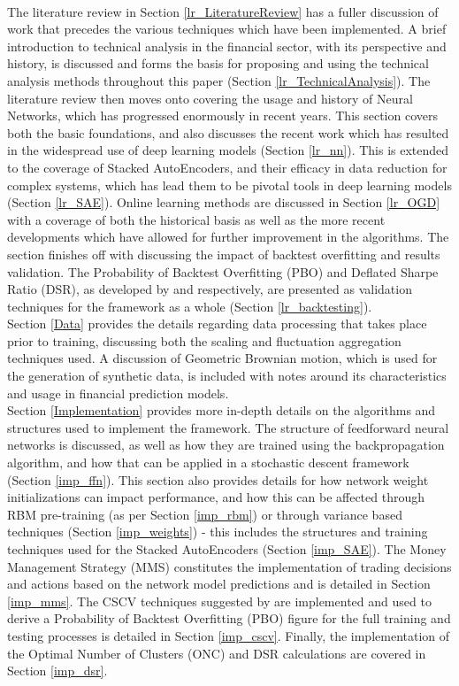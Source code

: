 \documentclass[a4paper,11pt,oneside]{article}
\theoremstyle{plain}
\theoremstyle{definition}
\begin{document}
	~\\\newline
	The literature review in Section \ref{lr_LiteratureReview} has a fuller discussion of work that precedes the various techniques which have been implemented. A brief introduction to technical analysis in the financial sector, with its perspective and history, is discussed and forms the basis for proposing and using the technical analysis methods throughout this paper (Section \ref{lr_TechnicalAnalysis}). The literature review then moves onto covering the usage and history of Neural Networks, which has progressed enormously in recent years. This section covers both the basic foundations, and also discusses the recent work which has resulted in the widespread use of deep learning models (Section \ref{lr_nn}). This is extended to the coverage of Stacked AutoEncoders, and their efficacy in data reduction for complex systems, which has lead them to be pivotal tools in deep learning models (Section \ref{lr_SAE}). Online learning methods are discussed in Section \ref{lr_OGD} with a coverage of both the historical basis as well as the more recent developments which have allowed for further improvement in the algorithms. The section finishes off with discussing the impact of backtest overfitting and results validation. 
	The Probability of Backtest Overfitting (PBO) and Deflated Sharpe Ratio (DSR), as developed by \citet{BailyPBO} and \citet{PradoDSR} respectively, are presented as validation techniques for the framework as a whole (Section \ref{lr_backtesting}).	
	~\\\newline
	Section \ref{Data} provides the details regarding data processing that takes place prior to training, discussing both the scaling and fluctuation aggregation techniques used. A discussion of Geometric Brownian motion, which is used for the generation of synthetic data, is included with notes around its characteristics and usage in financial prediction models.
	~\\\newline
		Section \ref{Implementation} provides more in-depth details on the algorithms and structures used to implement the framework. The structure of feedforward neural networks is discussed, as well as how they are trained using the backpropagation algorithm, and how that can be applied in a stochastic descent framework (Section \ref{imp_ffn}). This section also provides details for how network weight initializations can impact performance, and how this can be affected through RBM pre-training (as per Section \ref{imp_rbm}) or through variance based techniques (Section \ref{imp_weights}) - this includes the structures and training techniques used for the Stacked AutoEncoders (Section \ref{imp_SAE}). The Money Management Strategy (MMS) constitutes the implementation of trading decisions and actions based on the network model predictions and is detailed in Section \ref{imp_mms}. The CSCV techniques suggested by \citet{BailyPBO} are implemented and used to derive a Probability of Backtest Overfitting (PBO) figure for the full training and testing processes is detailed in Section \ref{imp_cscv}. Finally, the implementation of the Optimal Number of Clusters (ONC) and DSR calculations are covered in Section \ref{imp_dsr}.
\end{document}
